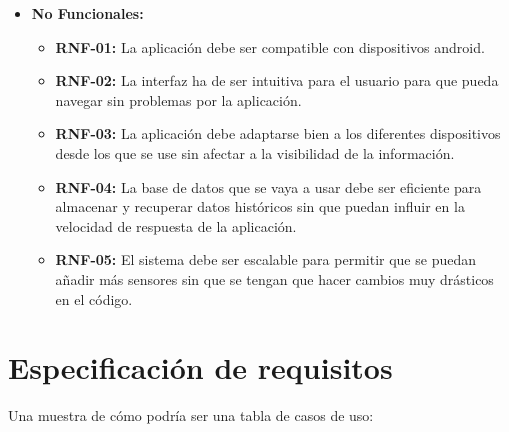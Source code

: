 \begin{itemize}
\begin{itemize}
        \end{itemize}
    \item \textbf{No Funcionales:}
        \begin{itemize}
            \item \textbf{RNF-01:} La aplicación debe ser compatible con dispositivos android.
            \item \textbf{RNF-02:} La interfaz ha de ser intuitiva para el usuario para que pueda navegar sin problemas por la aplicación.
            \item \textbf{RNF-03:} La aplicación debe adaptarse bien a los diferentes dispositivos desde los que se use sin afectar a la visibilidad de la información.
            \item \textbf{RNF-04:} La base de datos que se vaya a usar debe ser eficiente para almacenar y recuperar datos históricos sin que puedan influir en la velocidad de respuesta de la aplicación.
            \item \textbf{RNF-05:} El sistema debe ser escalable para permitir que se puedan añadir más sensores sin que se tengan que hacer cambios muy drásticos en el código.
        \end{itemize}
\end{itemize}


\section{Especificación de requisitos}


Una muestra de cómo podría ser una tabla de casos de uso:

